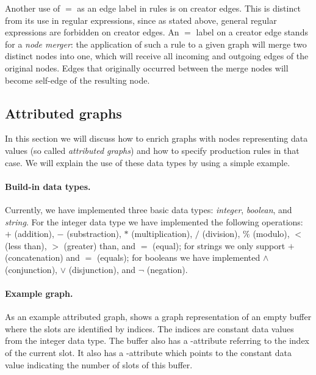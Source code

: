 Another use of $=$ as an edge label in rules is on creator edges. This is
distinct from its use in regular expressions, since as stated above, general
regular expressions are forbidden on creator edges. An $=$ label on a creator
edge stands for a \emph{node merger}: the application of such a rule to a given
graph will merge two distinct nodes into one, which will receive all incoming
and outgoing edges of the original nodes. Edges that originally
occurred between the merge nodes will become self-edge of the
resulting node.

\subsection{Attributed graphs}

In this section we will discuss how to enrich graphs with nodes
representing data values (so called \emph{attributed graphs}) and how
to specify production rules in that case. We will explain the use of
these data types by using a simple example.

\paragraph{Build-in data types.}

Currently, we have implemented three basic data types:
\emph{integer}, \emph{boolean}, and \emph{string}. For the integer
data type we have implemented the following operations: $+$ (addition),
$-$ (substraction), $*$ (multiplication), $/$ (division), $\%$
(modulo), $<$ (less than), $>$ (greater) than, and $=$ (equal); for
strings we only support $+$ (concatenation) and $=$ (equals); for
booleans we have implemented $\wedge$ (conjunction), $\vee$
(disjunction), and $\neg$ (negation).

\paragraph{Example graph.}

As an example attributed graph,  shows a graph
representation of an empty buffer where the slots are identified by
indices. The indices are constant data values from the integer data
type. The buffer also has a \current-attribute referring to the index
of the current slot. It also has a \capacity-attribute which points to
the constant data value indicating the number of slots of this
buffer.



